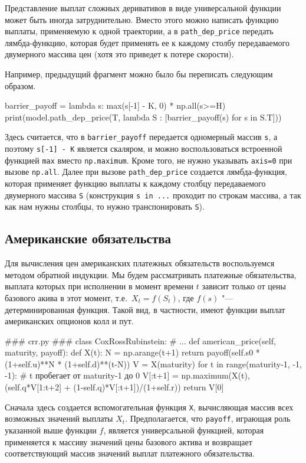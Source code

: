 \begin{remark}
Представление выплат сложных деривативов в виде универсальной функции может быть иногда затруднительно.
Вместо этого можно написать функцию выплаты, применяемую к одной траектории, а в \verb"path_dep_price" передать лямбда-функцию, которая будет применять ее к каждому столбу передаваемого двумерного массива цен (хотя это приведет к потере скорости).

Например, предыдущий фрагмент можно было бы переписать следующим образом.
\begin{python}
barrier_payoff = lambda s: max(s[-1] - K, 0) * np.all(s>=H)
print(model.path_dep_price(T, lambda S : [barrier_payoff(s) for s in S.T]))
\end{python}
Здесь считается, что в \verb"barrier_payoff" передается одномерный массив \verb"s", а поэтому \verb"s[-1] - K" является скаляром, и можно воспользоваться встроенной функцией \verb"max" вместо \verb"np.maximum".
Кроме того, не нужно указывать \verb"axis=0" при вызове \verb"np.all". 
Далее при вызове \verb"path_dep_price" создается лямбда-функция, которая применяет функцию выплаты к каждому столбцу передаваемого двумерного массива \verb"S" (конструкция \verb"s in ..." проходит по строкам массива, а так как нам нужны столбцы, то нужно транспонировать \verb"S").
\end{remark}


\subsection{Американские обязательства}
Для вычисления цен американских платежных обязательств воспользуемся методом обратной индукции.
Мы будем рассматривать платежные обязательства, выплата которых при исполнении в момент времени $t$ зависит только от цены базового акива в этот момент, т.е.\ $X_t=f(S_t)$, где $f(s)$ "--- детерминированная функция.
Такой вид, в частности, имеют функции выплат американских опционов колл и пут.
\begin{python}
### crr.py ###
class CoxRossRubinstein:
    # ...
    def american_price(self, maturity, payoff):
        def X(t):
            N = np.arange(t+1)
            return payoff(self.s0 * (1+self.u)**N * (1+self.d)**(t-N))
        V = X(maturity)
        for t in range(maturity-1, -1, -1): # t пробегает от maturity-1 до 0
            V[:t+1] = np.maximum(X(t),
                (self.q*V[1:t+2] + (1-self.q)*V[:t+1])/(1+self.r))
        return V[0]    
\end{python}
Сначала здесь создается вспомогательная функция \verb"X", вычисляющая массив всех возможных значений выплаты $X_t$.
Предполагается, что \verb"payoff", играющая роль указанной выше функции $f$, является универсальной функцией, которая применяется к массиву значений цены базового актива и возвращает соответствующий массив значений выплат платежного обязательства. 

